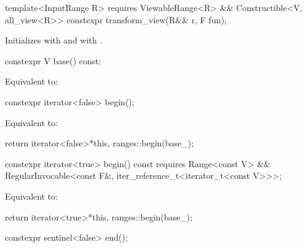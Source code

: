 %
\begin{itemdecl}
template<InputRange R>
  requires ViewableRange<R> && Constructible<V, all_view<R>>
constexpr transform_view(R&& r, F fun);
\end{itemdecl}

\begin{itemdescr}
\pnum
\effects Initializes  with 
and  with .
\end{itemdescr}

%
\begin{itemdecl}
constexpr V base() const;
\end{itemdecl}

\begin{itemdescr}
\pnum
\effects Equivalent to: 
\end{itemdescr}

%
\begin{itemdecl}
constexpr iterator<false> begin();
\end{itemdecl}

\begin{itemdescr}
\pnum
\effects Equivalent to:
\begin{codeblock}
return iterator<false>{*this, ranges::begin(base_)};
\end{codeblock}
\end{itemdescr}

%
\begin{itemdecl}
constexpr iterator<true> begin() const
  requires Range<const V> &&
           RegularInvocable<const F&, iter_reference_t<iterator_t<const V>>>;
\end{itemdecl}

\begin{itemdescr}
\pnum
\effects Equivalent to:
\begin{codeblock}
return iterator<true>{*this, ranges::begin(base_)};
\end{codeblock}
\end{itemdescr}

%
\begin{itemdecl}
constexpr sentinel<false> end();
\end{itemdecl}

